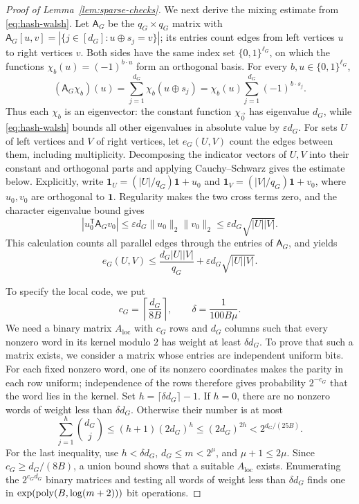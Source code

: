 \begin{proof}[Proof of Lemma~\ref{lem:sparse-checks}]
We next derive the mixing estimate from \eqref{eq:hash-walsh}.
Let $\mathsf A_G$ be the $q_G\times q_G$ matrix with
$\mathsf A_G[u,v]=|\{j\in[d_G]:u\oplus s_j=v\}|$; its entries
count edges from left vertices $u$ to right vertices $v$.
Both sides have the same index set $\{0,1\}^{\ell_G}$, on which
the functions $\chi_b(u)=(-1)^{b\cdot u}$ form an orthogonal basis.
For every $b,u\in\{0,1\}^{\ell_G}$,
\[
 (\mathsf A_G\chi_b)(u)
 =\sum_{j=1}^{d_G}\chi_b(u\oplus s_j)
 =\chi_b(u)\sum_{j=1}^{d_G}(-1)^{b\cdot s_j}.
\]
Thus each $\chi_b$ is an eigenvector: the constant function
$\chi_{\vec{0}}$ has eigenvalue $d_G$, while
\eqref{eq:hash-walsh} bounds all other eigenvalues in absolute value
by $\varepsilon d_G$.
For sets $U$ of left vertices and $V$ of right vertices, let
$e_G(U,V)$ count the edges between them, including multiplicity.
Decomposing the indicator vectors of $U,V$
into their constant and orthogonal parts and applying
Cauchy--Schwarz gives the estimate below. Explicitly, write
$\mathbf1_U=(|U|/q_G)\mathbf1+u_0$ and
$\mathbf1_V=(|V|/q_G)\mathbf1+v_0$, where $u_0,v_0$ are
orthogonal to $\mathbf1$. Regularity makes the two cross terms
zero, and the character eigenvalue bound gives
\[
 |u_0^{\mathsf T}\mathsf A_Gv_0|
 \le\varepsilon d_G\|u_0\|_2\|v_0\|_2
 \le\varepsilon d_G\sqrt{|U||V|}.
\]
This calculation counts all parallel edges through the entries of
$\mathsf A_G$, and yields
\begin{equation}\label{eq:hash-mixing}
 e_G(U,V)\le
 \frac{d_G|U||V|}{q_G}
 +\varepsilon d_G\sqrt{|U||V|}.
\end{equation}

To specify the local code, we put
\[
 c_G=\left\lceil\frac{d_G}{8B}\right\rceil,
 \qquad \delta=\frac1{100B\mu}.
\]
We need a binary matrix $A_{\mathrm{loc}}$ with $c_G$ rows and
$d_G$ columns such that every nonzero word in its kernel modulo $2$
has weight at least $\delta d_G$. To prove that such a matrix exists,
we consider a matrix whose entries are independent uniform bits.
For each fixed nonzero word, one of
its nonzero coordinates makes the parity in each row uniform;
independence of the rows therefore gives probability $2^{-c_G}$
that the word lies in the kernel.
Set $h=\lceil\delta d_G\rceil-1$. If $h=0$, there are
no nonzero words of weight less than $\delta d_G$. Otherwise their
number is at most
\[
 \sum_{j=1}^{h}\binom{d_G}{j}
 \le(h+1)(2d_G)^h
 \le(2d_G)^{2h}
 <2^{d_G/(25B)}.
\]
For the last inequality, use $h<\delta d_G$, $d_G\le m<2^\mu$,
and $\mu+1\le2\mu$. Since $c_G\ge d_G/(8B)$, a union bound shows
that a suitable $A_{\mathrm{loc}}$ exists. Enumerating the
$2^{c_Gd_G}$ binary matrices and testing all words of weight less
than $\delta d_G$ finds one in
$\exp(\operatorname{poly}(B,\log(m+2)))$ bit operations.


\end{proof}
